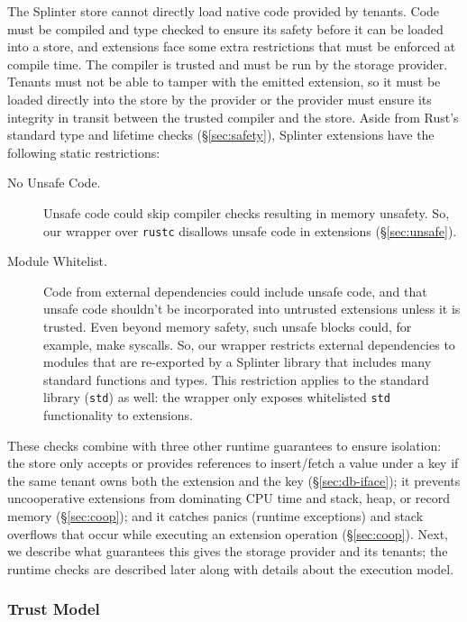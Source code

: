 The Splinter store cannot directly load native code provided by tenants.
Code must be compiled and type checked to ensure its safety before it can be
  loaded into a store, and extensions face some extra restrictions that must be
  enforced at compile time.
The compiler is trusted and must be run by the storage provider.
Tenants must not be able to tamper with the emitted extension, so it must be
  loaded directly into the store by the provider or the provider must
  ensure its integrity in transit between the trusted compiler and the store.
Aside from Rust's standard type and lifetime checks (\S\ref{sec:safety}),
  Splinter extensions have the following static restrictions:
  \begin{description}
    \item[No Unsafe Code.]
      Unsafe code could skip compiler checks resulting in memory unsafety.
      So, our wrapper over \texttt{rustc} disallows unsafe code in extensions
      (\S\ref{sec:unsafe}).
    \item[Module Whitelist.]
      Code from external dependencies could include unsafe code, and that
        unsafe code shouldn't be incorporated into untrusted extensions unless it
        is trusted.
      Even beyond memory safety, such unsafe blocks could, for example, make
        syscalls.
      So, our wrapper restricts external dependencies to modules that are
        re-exported by a Splinter library that includes many standard functions
        and types.
      This restriction applies to the standard library (\texttt{std}) as well: the
        wrapper only exposes whitelisted \texttt{std} functionality to extensions.
  \end{description}
These checks combine with three other runtime guarantees to
  ensure isolation:
the store only accepts or provides references to insert/fetch a value under a key
  if the same tenant owns both the extension and the key (\S\ref{sec:db-iface});
it prevents uncooperative extensions from dominating CPU time and stack, heap, or record memory (\S\ref{sec:coop}); and
it catches panics (runtime exceptions) and stack overflows that occur while executing an
  extension operation (\S\ref{sec:coop}).
Next, we describe what guarantees this gives the storage provider and its tenants;
  the runtime checks are described later along with details about the execution model.

\subsubsection{Trust Model}
\label{sec:trust}


